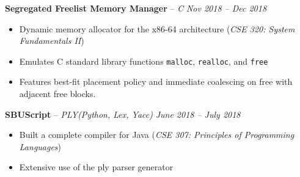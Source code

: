 \documentclass[11pt,letterpaper]{article}
\begin{document}

\headedsection 
{\textbf{Segregated Freelist Memory Manager} -- \textit{C}}
{\textit{Nov 2018 -- Dec 2018}} {
	\begin{itemize}[noitemsep,nolistsep]
		\item Dynamic memory allocator for the x86-64 architecture (\textit{CSE 320: System Fundamentals II})
		\item Emulates C standard library functions \texttt{malloc}, \texttt{realloc}, and \texttt{free}
		\item Features best-fit placement policy and immediate coalescing on free with adjacent free blocks.	      		      		      		      		
	\end{itemize}
}
										

\headedsection 
{\textbf{SBUScript} -- \textit{PLY(Python, Lex, Yacc)}}
{\textit{June 2018 -- July 2018}} {
	\begin{itemize}[noitemsep,nolistsep]
		\item Built a complete compiler for Java (\textit{CSE 307: Principles of Programming Languages})
		\item Extensive use of the ply parser generator
	\end{itemize}
}
										
																						
\end{document}
